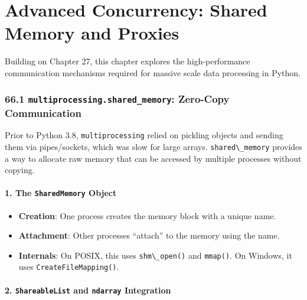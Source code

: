 \hypertarget{advanced-concurrency-shared-memory-and-proxies}{%
\chapter{Advanced Concurrency: Shared Memory and
Proxies}\label{advanced-concurrency-shared-memory-and-proxies}}

Building on Chapter 27, this chapter explores the high-performance
communication mechanisms required for massive scale data processing in
Python.

\hypertarget{multiprocessing.shared_memory-zero-copy-communication}{%
\subsection{\texorpdfstring{66.1
\texttt{multiprocessing.shared\_memory}: Zero-Copy
Communication}{66.1 multiprocessing.shared\_memory: Zero-Copy Communication}}\label{multiprocessing.shared_memory-zero-copy-communication}}

Prior to Python 3.8, \passthrough{\lstinline!multiprocessing!} relied on
pickling objects and sending them via pipes/sockets, which was slow for
large arrays. \passthrough{\lstinline!shared\_memory!} provides a way to
allocate raw memory that can be accessed by multiple processes without
copying.

\hypertarget{the-sharedmemory-object}{%
\subsubsection{\texorpdfstring{1. The \texttt{SharedMemory}
Object}{1. The SharedMemory Object}}\label{the-sharedmemory-object}}

\begin{itemize}
\tightlist
\item
  \textbf{Creation}: One process creates the memory block with a unique
  name.
\item
  \textbf{Attachment}: Other processes ``attach'' to the memory using
  the name.
\item
  \textbf{Internals}: On POSIX, this uses
  \passthrough{\lstinline!shm\_open()!} and
  \passthrough{\lstinline!mmap()!}. On Windows, it uses
  \passthrough{\lstinline!CreateFileMapping()!}.
\end{itemize}

\hypertarget{shareablelist-and-ndarray-integration}{%
\subsubsection{\texorpdfstring{2. \texttt{ShareableList} and
\texttt{ndarray}
Integration}{2. ShareableList and ndarray Integration}}\label{shareablelist-and-ndarray-integration}}

